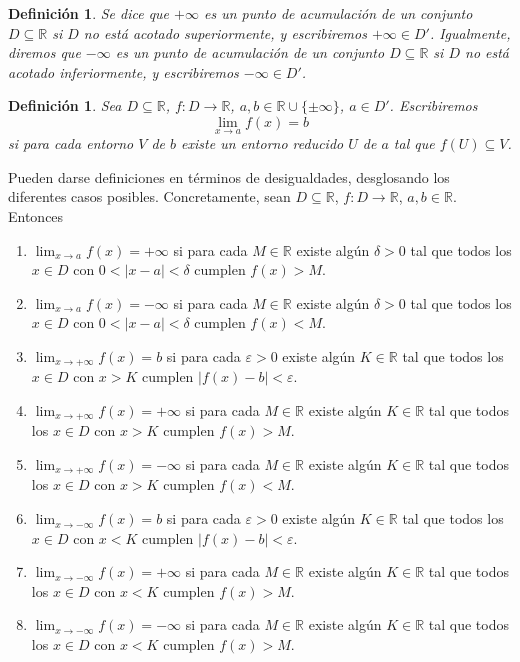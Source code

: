 \documentclass[12pt]{article}
\newtheorem{definition}[theorem]{Definición}
\begin{document}
\begin{definition} Se dice que $+ \infty	$ es un punto de acumulación de un conjunto $D \subseteq \mathbb{R}$ si $D$ no está acotado superiormente, y escribiremos $+ \infty \in D'$. Igualmente, diremos que $- \infty$ es un punto de acumulación de un conjunto $D \subseteq \mathbb{R}$ si $D$ no está acotado inferiormente, y escribiremos $- \infty	\in D'$.
\end{definition}

\begin{definition} Sea $D \subseteq \mathbb{R}$, $f \colon D \longrightarrow \mathbb{R}$, $a,b \in \mathbb{R} \cup \lbrace \pm \infty \rbrace$, $a \in D'$. Escribiremos $$\lim_{x \rightarrow a } f(x) = b$$ si para cada entorno $V$ de $b$ existe un entorno reducido $U$ de $a$ tal que $f(U) \subseteq V$.
\end{definition}

Pueden darse definiciones en términos de desigualdades, desglosando los diferentes casos posibles. Concretamente, sean $D \subseteq \mathbb{R}$, $f \colon D \longrightarrow \mathbb{R}$, $a,b \in \mathbb{R}$. Entonces
\begin{enumerate}
\item $\lim_{x \rightarrow a} f(x) = + \infty	$ si para cada $M \in \mathbb{R}$ existe algún $\delta >0$ tal que todos los $x \in D$ con $0 < |x-a | < \delta$ cumplen $f(x) > M$.
\item $\lim_{x \rightarrow a} f(x) = - \infty	$ si para cada $M \in \mathbb{R}$ existe algún $\delta >0$ tal que todos los $x \in D$ con $0 < |x-a | < \delta$ cumplen $f(x) < M$.
\item $\lim_{x \rightarrow + \infty} f(x) = b	$ si para cada $\varepsilon >0 $ existe algún $K \in \mathbb{R}$ tal que todos los $x \in D$ con $x >K$ cumplen $|f(x) -b | < \varepsilon$.
\item $\lim_{x \rightarrow + \infty} f(x) = + \infty	$ si para cada $M \in \mathbb{R}$ existe algún $K \in \mathbb{R}$ tal que todos los $x \in D$ con $x>K$ cumplen $f(x) >M$. 
\item $\lim_{x \rightarrow + \infty} f(x) = - \infty	$ si para cada $M \in \mathbb{R}$ existe algún $K \in \mathbb{R}$ tal que todos los $x \in D$ con $x>K$ cumplen $f(x) <M$. 
\item $\lim_{x \rightarrow -\infty} f(x) = b	$ si para cada $\varepsilon >0 $ existe algún $K \in \mathbb{R}$ tal que todos los $x \in D$ con $x <K$ cumplen $|f(x) -b | < \varepsilon$.
\item $\lim_{x \rightarrow - \infty} f(x) = + \infty	$ si para cada $M \in \mathbb{R}$ existe algún $K \in \mathbb{R}$ tal que todos los $x \in D$ con $x<K$ cumplen $f(x) >M$.
\item $\lim_{x \rightarrow - \infty} f(x) = - \infty	$ si para cada $M \in \mathbb{R}$ existe algún $K \in \mathbb{R}$ tal que todos los $x \in D$ con $x<K$ cumplen $f(x) >M$.
\end{enumerate}
\end{document}

